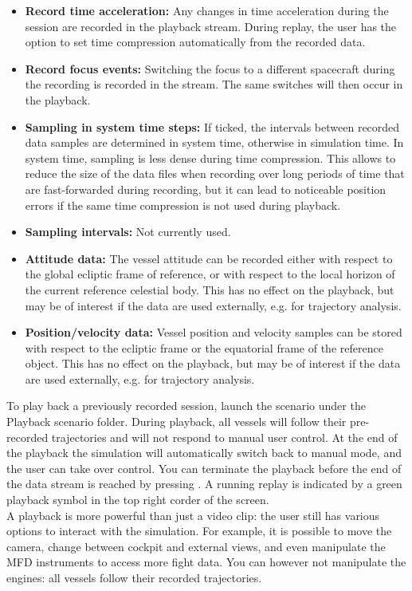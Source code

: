 \documentclass[Orbiter User Manual.tex]{subfiles}
\begin{document}
\begin{itemize}
\item \textbf{Record time acceleration:} Any changes in time acceleration during the session are recorded in the playback stream. During replay, the user has the option to set time compression automatically from the recorded data.
\item \textbf{Record focus events:} Switching the focus to a different spacecraft during the recording is recorded in the stream. The same switches will then occur in the playback.
\item \textbf{Sampling in system time steps:} If ticked, the intervals between recorded data samples are determined in system time, otherwise in simulation time. In system time, sampling is less dense during time compression. This allows to reduce the size of the data files when recording over long periods of time that are fast-forwarded during recording, but it can lead to noticeable position errors if the same time compression is not used during playback.
\item \textbf{Sampling intervals:} Not currently used.
\item \textbf{Attitude data:} The vessel attitude can be recorded either with respect to the global ecliptic frame of reference, or with respect to the local horizon of the current reference celestial body. This has no effect on the playback, but may be of interest if the data are used externally, e.g. for trajectory analysis.
\item \textbf{Position/velocity data:} Vessel position and velocity samples can be stored with respect to the ecliptic frame or the equatorial frame of the reference object. This has no effect on the playback, but may be of interest if the data are used externally, e.g. for trajectory analysis.
\end{itemize}

\noindent
To play back a previously recorded session, launch the scenario under the Playback scenario folder. During playback, all vessels will follow their pre-recorded trajectories and will not respond to manual user control. At the end of the playback the simulation will automatically switch back to manual mode, and the user can take over control. You can terminate the playback before the end of the data stream is reached by pressing \Ctrl{}. A running replay is indicated by a green playback symbol in the top right corder of the screen.\\
A playback is more powerful than just a video clip: the user still has various options to interact with the simulation. For example, it is possible to move the camera, change between cockpit and external views, and even manipulate the MFD instruments to access more fight data. You can however not manipulate the engines: all vessels follow their recorded trajectories.\\
\end{document}
